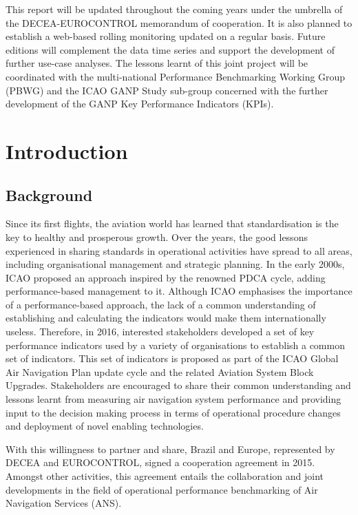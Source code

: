 \documentclass[
  a4paper,
  DIV=11,
  numbers=noendperiod]{scrreprt}
\begin{document}
This report will be updated throughout the coming years under the
umbrella of the DECEA-EUROCONTROL memorandum of cooperation. It is also
planned to establish a web-based rolling monitoring updated on a regular
basis. Future editions will complement the data time series and support
the development of further use-case analyses. The lessons learnt of this
joint project will be coordinated with the multi-national Performance
Benchmarking Working Group (PBWG) and the ICAO GANP Study sub-group
concerned with the further development of the GANP Key Performance
Indicators (KPIs).


\hypertarget{introduction}{%
\chapter{Introduction}\label{introduction}}

{}
\setcounter{page}{1}

\hypertarget{background}{%
\section{Background}\label{background}}

Since its first flights, the aviation world has learned that
standardisation is the key to healthy and prosperous growth. Over the
years, the good lessons experienced in sharing standards in operational
activities have spread to all areas, including organisational management
and strategic planning. In the early 2000s, ICAO proposed an approach
inspired by the renowned PDCA cycle, adding performance-based management
to it. Although ICAO emphasises the importance of a performance-based
approach, the lack of a common understanding of establishing and
calculating the indicators would make them internationally useless.
Therefore, in 2016, interested stakeholders developed a set of key
performance indicators used by a variety of organisations to establish a
common set of indicators. This set of indicators is proposed as part of
the ICAO Global Air Navigation Plan update cycle and the related
Aviation System Block Upgrades. Stakeholders are encouraged to share
their common understanding and lessons learnt from measuring air
navigation system performance and providing input to the decision making
process in terms of operational procedure changes and deployment of
novel enabling technologies.

With this willingness to partner and share, Brazil and Europe,
represented by DECEA and EUROCONTROL, signed a cooperation agreement in
2015. Amongst other activities, this agreement entails the collaboration
and joint developments in the field of operational performance
benchmarking of Air Navigation Services (ANS).
\end{document}

